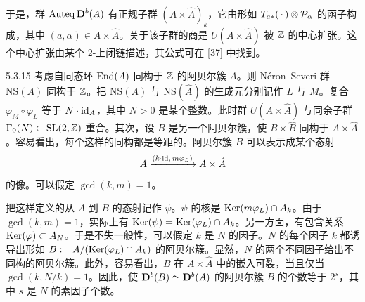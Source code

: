 于是，群 $\operatorname{Auteq}\mathbf{D}^{b}(A)$ 有正规子群 $(A\times\hat A)_k$，它由形如 $T_{a*}(\,\cdot\,)\otimes\mathcal{P}_\alpha$ 的函子构成，其中 $(a,\alpha)\in A\times\hat A$。关于该子群的商是 $U(A\times\hat A)$ 被 $\mathbb{Z}$ 的中心扩张。这个中心扩张由某个 2-上闭链描述，其公式可在 [37] 中找到。

\begin{example}{5.3.15}
考虑自同态环 $\operatorname{End}(A)$ 同构于 $\mathbb{Z}$ 的阿贝尔簇 $A$。则 Néron--Severi 群 $\mathrm{NS}(A)$ 同构于 $\mathbb{Z}$。把 $\mathrm{NS}(A)$ 与 $\mathrm{NS}(\hat A)$ 的生成元分别记作 $L$ 与 $M$。复合 $\varphi_M\circ\varphi_L$ 等于 $N\cdot\mathrm{id}_A$，其中 $N>0$ 是某个整数。此时群 $U(A\times\hat A)$ 与同余子群 $\Gamma_0(N)\subset\mathrm{SL}(2,\mathbb{Z})$ 重合。其次，设 $B$ 是另一个阿贝尔簇，使 $B\times\hat B$ 同构于 $A\times\hat A$。容易看出，每个这样的同构都是等距的。阿贝尔簇 $B$ 可以表示成某个态射
\begin{equation*}
A\xrightarrow{(k\cdot\mathrm{id},\,m\varphi_L)}A\times\hat A
\end{equation*}
的像。可以假定 $\gcd(k,m)=1$。

把这样定义的从 $A$ 到 $B$ 的态射记作 $\psi$。$\psi$ 的核是 $\operatorname{Ker}(m\varphi_L)\cap A_k$。由于 $\gcd(k,m)=1$，实际上有 $\operatorname{Ker}(\psi)=\operatorname{Ker}(\varphi_L)\cap A_k$。另一方面，有包含关系 $\operatorname{Ker}(\varphi)\subset A_N$。于是不失一般性，可以假定 $k$ 是 $N$ 的因子。$N$ 的每个因子 $k$ 都诱导出形如 $B:=A/(\operatorname{Ker}(\varphi_L)\cap A_k)$ 的阿贝尔簇。显然，$N$ 的两个不同因子给出不同构的阿贝尔簇。此外，容易看出，$B$ 在 $A\times\hat A$ 中的嵌入可裂，当且仅当 $\gcd(k,N/k)=1$。因此，使 $\mathbf{D}^{b}(B)\simeq\mathbf{D}^{b}(A)$ 的阿贝尔簇 $B$ 的个数等于 $2^s$，其中 $s$ 是 $N$ 的素因子个数。
\end{example}


